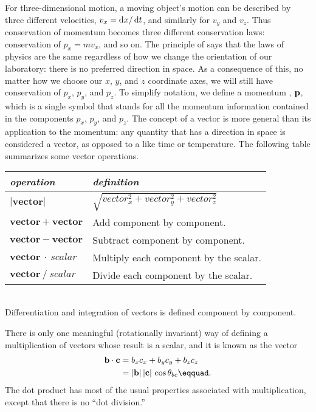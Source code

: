 	For three-dimensional motion, a moving object's motion can be described
	by three different velocities, $v_x=\operatorname{d\!} x/\operatorname{d\!} t$, and similarly for $v_y$ and $v_z$.
	Thus conservation of momentum becomes three different conservation laws:
	conservation of $p_x=mv_x$, and so on. The principle of 
	says that the laws of physics are the same regardless of how we change the
	orientation of our laboratory: there is no preferred direction in space.
	As a consequence of this, no matter how we choose our $x$, $y$, and
	$z$ coordinate axes, we will still have conservation of $p_x$, $p_y$, and
	$p_z$. To simplify notation, we define a momentum , $\mathbf{p}$, which
	is a single symbol that stands for all the momentum information
	contained in the components $p_x$, $p_y$, and $p_z$. The concept of a vector
	is more general than its application to the momentum: any quantity that has
	a direction in space is considered a vector, as opposed to a 
	like time or temperature. The following table summarizes some vector operations.\\
	\begin{tabular}{|l|p{65mm}|}
	\hline
	\textsl{operation}	& \textsl{definition} \\
	\hline
	$|\mathbf{vector}|$	& $\sqrt{vector_x^2+vector_y^2+vector_z^2}$ \\
	$\mathbf{vector}+\mathbf{vector}$	& Add component by component. \\
	$\mathbf{vector}-\mathbf{vector}$	& Subtract component by component. \\
	$\mathbf{vector}\ \cdot\ scalar	$	& Multiply each component by the scalar. \\
	$\mathbf{vector}\ /\ scalar	$	& Divide each component by the scalar. \\
	\hline
	\end{tabular}\\
	Differentiation and integration of vectors is defined component by component.
	
	There is only one meaningful (rotationally invariant)
	way of defining a multiplication of vectors
	whose result is a scalar, and it is known as the vector 
	\begin{align*}	
		\vc{b}\cdot\vc{c}	
			&=  b_{x} c_{x}+ b_y c_{y}+ b_{z} c_z \\
			&= |\vc{b}|\,|\vc{c}|\,\cos\theta_{bc}\eqquad.
	\end{align*}
	The dot product has most of the usual properties associated with multiplication,
	except that there is no ``dot division.''

